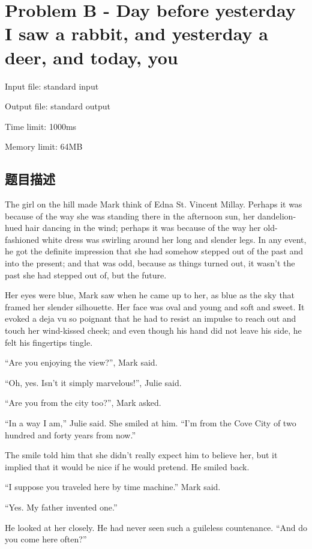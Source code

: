 \newpage
\section{Problem B - Day before yesterday I saw a rabbit, and yesterday a deer, and today, you}
{ \limitfont{}
Input file: standard input \par
Output file: standard output \par
Time limit: 1000ms \par
Memory limit: 64MB \par
}
\subsection*{题目描述}
The girl on the hill made Mark think of Edna St. Vincent Millay. Perhaps it was because of the way she was standing there in the afternoon sun, her dandelion-hued hair dancing in the wind; perhaps it was because of the way her old-fashioned white dress was swirling around her long and slender legs. In any event, he got the definite impression that she had somehow stepped out of the past and into the present; and that was odd, because as things turned out, it wasn't the past she had stepped out of, but the future.

Her eyes were blue, Mark saw when he came up to her, as blue as the sky that framed her slender silhouette. Her face was oval and young and soft and sweet. It evoked a deja vu so poignant that he had to resist an impulse to reach out and touch her wind-kissed cheek; and even though his hand did not leave his side, he felt his fingertips tingle.

``Are you enjoying the view?'', Mark said.

``Oh, yes. Isn't it simply marvelous!'', Julie said.

``Are you from the city too?'', Mark asked.

``In a way I am,'' Julie said. She smiled at him. ``I'm from the Cove City of two hundred and forty years from now.''

The smile told him that she didn't really expect him to believe her, but it implied that it would be nice if he would pretend. He smiled back.

``I suppose you traveled here by time machine.'' Mark said.

``Yes. My father invented one.''

He looked at her closely. He had never seen such a guileless countenance. ``And do you come here often?''

